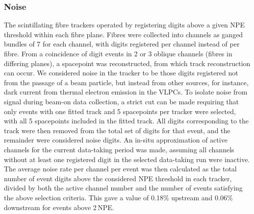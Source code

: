 \subsubsection{Noise}
The scintillating fibre trackers operated by registering digits above a given NPE threshold within each fibre plane. Fibres were collected into channels as ganged bundles of 7 for each channel, with digits registered per channel instead of per fibre. From a coincidence of digit events in 2 or 3 oblique channels (fibres in differing planes), a spacepoint was reconstructed, from which track reconstruction can occur. We considered noise in the tracker to be those digits registered not from the passage of a beam particle, but instead from other sources, for instance, dark current from thermal electron emission in the VLPCs. To isolate noise from signal during beam-on data collection, a strict cut can be made requiring that only events with one fitted track and 5 spacepoints per tracker were selected, with all 5 spacepoints included in the fitted track. All digits corresponding to the track were then removed from the total set of digits for that event, and the remainder were considered noise digits. An in-situ approximation of active channels for the current data-taking period was made, assuming all channels without at least one registered digit in the selected data-taking run were inactive. The average noise rate per channel per event was then calculated as the total number of event digits above the considered NPE threshold in each tracker, divided by both the active channel number and the number of events satisfying the above selection criteria. This gave a value of 0.18\% upstream and 0.06\% downstream for events above 2\,NPE. 

